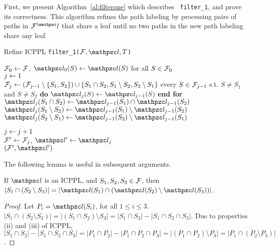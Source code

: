 First, we present Algorithm~\ref{al:filterone} which describes {\tt
  filter\_1}, and prove its correctness.  This algorithm refines the
path labeling by processing pairs of paths in $\cF^\cl$ that share a
leaf until no two paths in the new path labeling share any leaf.

\begin{algorithm}[h]
  \caption{Refine ICPPL {\tt filter\_1($\cF, \cl, T$)}}
  \label{al:filterone} %
  \begin{algorithmic}[\lndisplay]
    \STATE ${\cal F}_0 \leftarrow {\cal F}$, $\cl_0(S) \assign \cl(S)$ for all $S \in {\cal F}_0$\\
    \STATE $j \leftarrow 1$\\
    \label{shareleaf} \STATE ${\cal F}_j \leftarrow ({\cal F}_{j-1} \setminus
    \{S_1, S_2\}) \cup \{S_1 \cap S_2, S_1 \setminus S_2, S_2
    \setminus S_1 \}$ \label{setbreak}   every $S \in
    {\cal F}_{j-1}$ s.t. $S \ne S_1$ and $S \ne
    S_2$ {\bf do} $\cl_j(S) \assign \cl_{j-1}(S)$ {\bf end for}\\

    \STATE $\cl_j(S_1 \cap S_2) \assign \cl_{j-1}(S_1) \cap
    \cl_{j-1}(S_2)$  \STATE $\cl_j(S_1
    \setminus S_2) \assign \cl_{j-1}(S_1) \setminus \cl_{j-1}(S_2)$
     \STATE $\cl_j(S_2
    \setminus S_1) \assign \cl_{j-1}(S_2) \setminus \cl_{j-1}(S_1)$


    \STATE $j \leftarrow j+1$\\
    \ENDWHILE
    \STATE ${\cal F}' \leftarrow {\cal F}_j$, $\cl' \assign \cl_j$\\
    \RETURN $(\cF', \cl')$
  \end{algorithmic}
\end{algorithm}


The following lemma is useful in subsequent arguments.
\begin{lemma}
  \label{lem:setminuscard}
  If $\cl$ is an ICPPL, and $S_1, S_2, S_3 \in {\cal F}$, then $|S_1 \cap
  (S_2 \setminus S_3)| = |\cl(S_1) \cap (\cl(S_2) \setminus
  \cl(S_3))|$.
\end{lemma}
\begin{proof}\thesisspacing%
  Let $P_i = \cl(S_i)$, for all $1 \le i \le 3$.  $|S_1 \cap (S_2
  \setminus S_3)| = |(S_1 \cap S_2) \setminus S_3| = |S_1 \cap S_2| -
  |S_1 \cap S_2 \cap S_3|$. Due to properties (ii) and (iii) of ICPPL,
  $|S_1 \cap S_2| - |S_1 \cap S_2 \cap S_3| = |P_1 \cap P_2| - |P_1
  \cap P_2 \cap P_3| = |(P_1 \cap P_2) \setminus P_3| = |P_1 \cap (P_2
  \setminus P_3)|$. %
\end{proof}

